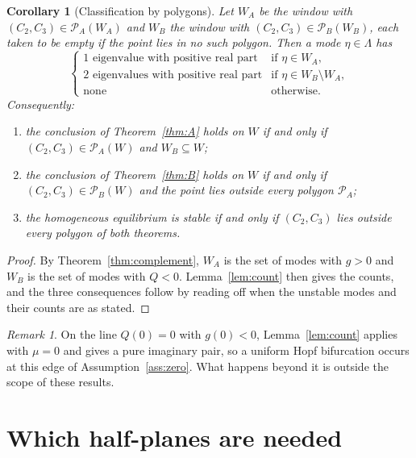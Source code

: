 \documentclass[11pt]{article}
\newtheorem{corollary}{Corollary}
\theoremstyle{definition}
\theoremstyle{remark}
\newtheorem{remark}{Remark}
\begin{document}
\begin{corollary}[Classification by polygons]\label{cor:classify}
Let $W_A$ be the window with $(C_2,C_3)\in\mathcal{P}_A(W_A)$ and $W_B$ the window with $(C_2,C_3)\in\mathcal{P}_B(W_B)$, each taken to be empty if the point lies in no such polygon. Then a mode $\eta\in\Lambda$ has
\[
\begin{cases}
1 \text{ eigenvalue with positive real part} & \text{if }\eta\in W_A,\\
2 \text{ eigenvalues with positive real part} & \text{if }\eta\in W_B\setminus W_A,\\
\text{none} & \text{otherwise}.
\end{cases}
\]
Consequently:
\begin{enumerate}
\item the conclusion of Theorem~\ref{thm:A} holds on $W$ if and only if $(C_2,C_3)\in\mathcal{P}_A(W)$ and $W_B\subseteq W$;
\item the conclusion of Theorem~\ref{thm:B} holds on $W$ if and only if $(C_2,C_3)\in\mathcal{P}_B(W)$ and the point lies outside every polygon $\mathcal{P}_A$;
\item the homogeneous equilibrium is stable if and only if $(C_2,C_3)$ lies outside every polygon of both theorems.
\end{enumerate}
\end{corollary}

\begin{proof}
By Theorem~\ref{thm:complement}, $W_A$ is the set of modes with $g>0$ and $W_B$ is the set of modes with $Q<0$. Lemma~\ref{lem:count} then gives the counts, and the three consequences follow by reading off when the unstable modes and their counts are as stated.
\end{proof}

\begin{remark}
On the line $Q(0)=0$ with $g(0)<0$, Lemma~\ref{lem:count} applies with $\mu=0$ and gives a pure imaginary pair, so a uniform Hopf bifurcation occurs at this edge of Assumption~\ref{ass:zero}. What happens beyond it is outside the scope of these results.
\end{remark}

\section{Which half-planes are needed}
\end{document}
